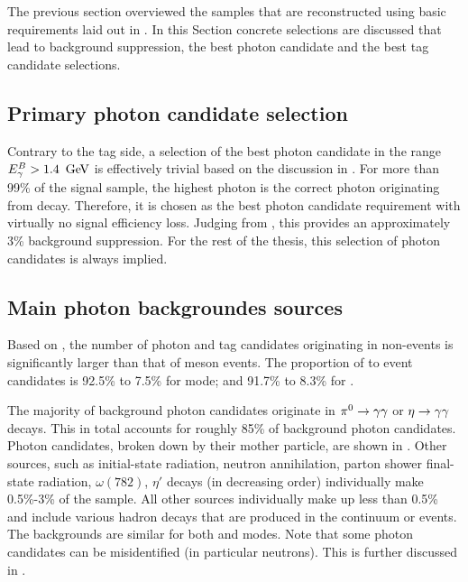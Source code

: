 The previous section overviewed the samples that are reconstructed using basic requirements laid out in .
In this Section concrete selections are discussed that lead to background suppression, the best photon candidate
and the best tag candidate selections.

\subsection{Primary photon candidate selection}\label{sec:primary_photon_candidate_selection}
Contrary to the tag side, a selection of the best photon candidate in the range ${E^B_{\gamma}}>1.4~\mathrm{\,Ge\kern -0.1em V}$ 
is effectively trivial based on the discussion in .
For more than 99\% of the signal \MC sample, the highest \EB photon 
is the correct photon originating from \BtoXsgamma decay.
Therefore, it is chosen as the best photon candidate requirement with virtually no signal efficiency loss.
Judging from , this provides an approximately 3\% background suppression.
For the rest of the thesis, this selection of photon candidates is always implied.

\subsection{Main photon backgroundes sources}\label{sec:main_background_sources}

Based on , the number of photon and tag candidates originating 
in non-\BB events is significantly larger than that of \B meson events.
The proportion of \qqbar to \BB event candidates is 92.5\% to 7.5\% for \feiBp mode;
and 91.7\% to 8.3\% for \feiBz.

The majority of background photon candidates originate in $\pi^0\rightarrow\gamma\gamma$ or $\eta\rightarrow\gamma\gamma$ decays.
This in total accounts for roughly 85\% of background photon candidates.
Photon candidates, broken down by their mother particle, are shown in .
Other sources, such as initial-state radiation, neutron annihilation, parton shower final-state radiation, $\omega(782)$, $\eta'$ decays (in decreasing order) individually make 0.5\%-3\% of the sample.
All other sources individually make up less than 0.5\% and include various hadron decays that are produced in the continuum or \B events.
The backgrounds are similar for both \feiBp and \feiBz modes.
Note that some photon candidates can be misidentified (in particular neutrons). 
This is further discussed in .

